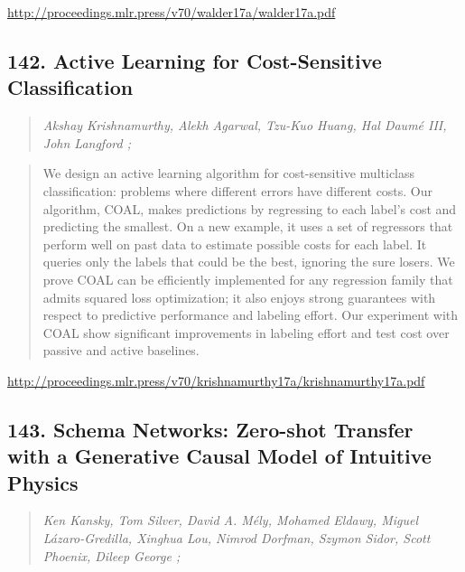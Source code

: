 \documentclass{article}
\begin{document}
\href{http://proceedings.mlr.press/v70/walder17a/walder17a.pdf}{http://proceedings.mlr.press/v70/walder17a/walder17a.pdf}

\subsection{142. Active Learning for Cost-Sensitive Classification}

\begin{quote}
\footnotesize{\textit{Akshay Krishnamurthy, Alekh Agarwal, Tzu-Kuo Huang, Hal Daumé III, John Langford ;}}

\end{quote}

\begin{quote}
    We design an active learning algorithm for cost-sensitive multiclass classification: problems where different errors have different costs. Our algorithm, COAL, makes predictions by regressing to each label’s cost and predicting the smallest. On a new example, it uses a set of regressors that perform well on past data to estimate possible costs for each label. It queries only the labels that could be the best, ignoring the sure losers. We prove COAL can be efficiently implemented for any regression family that admits squared loss optimization; it also enjoys strong guarantees with respect to predictive performance and labeling effort. Our experiment with COAL show significant improvements in labeling effort and test cost over passive and active baselines.  
\end{quote}

\href{http://proceedings.mlr.press/v70/krishnamurthy17a/krishnamurthy17a.pdf}{http://proceedings.mlr.press/v70/krishnamurthy17a/krishnamurthy17a.pdf}

\subsection{143. Schema Networks: Zero-shot Transfer with a Generative Causal Model of Intuitive Physics}

\begin{quote}
\footnotesize{\textit{Ken Kansky, Tom Silver, David A. Mély, Mohamed Eldawy, Miguel Lázaro-Gredilla, Xinghua Lou, Nimrod Dorfman, Szymon Sidor, Scott Phoenix, Dileep George ;}}

\end{quote}
\end{document}
